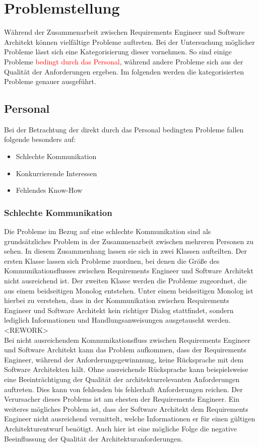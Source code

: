 \section{Problemstellung}
Während der Zusammenarbeit zwischen Requirements Engineer und Software Architekt können vielfältige Probleme auftreten. Bei der Untersuchung möglicher Probleme lässt sich eine Kategorisierung dieser vornehmen. So sind einige Probleme \textcolor{red}{bedingt durch das Personal}, während andere Probleme sich aus der Qualität der Anforderungen ergeben. Im folgenden werden die kategorisierten Probleme genauer ausgeführt.

\subsection{Personal}
Bei der Betrachtung der direkt durch das Personal bedingten Probleme fallen folgende besonders auf:
\begin{itemize} 
\item Schlechte Kommunikation
\item Konkurrierende Interessen
\item Fehlendes Know-How \\
\end{itemize}

\subsubsection{Schlechte Kommunikation}
Die Probleme im Bezug auf eine schlechte Kommunikation sind als grundsätzliches Problem in der Zusammenarbeit zwischen mehreren Personen zu sehen. In diesem Zusammenhang lassen sie sich in zwei Klassen aufteilten. Der ersten Klasse lassen sich Probleme zuordnen, bei denen die Größe des Kommunikationsflusses zwischen Requirements Engineer und Software Architekt nicht ausreichend ist. Der zweiten Klasse werden die Probleme zugeordnet, die aus einem beidseitigen Monolog entstehen. Unter einem beidseitigen Monolog ist hierbei zu verstehen, dass in der Kommunikation zwischen Requirements Engineer und Software Architekt kein richtiger Dialog stattfindet, sondern lediglich Informationen und Handlungsanweisungen ausgetauscht werden. <REWORK>\\

Bei nicht ausreichendem Kommunikationsfluss zwischen Requirements Engineer und Software Architekt kann das Problem aufkommen, dass der Requirements Engineer, während der Anforderungsgewinnnung, keine Rücksprache mit dem Software Architekten hält. Ohne ausreichende Rücksprache kann beispielsweise eine Beeinträchtigung der Qualität der architekturrelevanten Anforderungen auftreten. Dies kann von fehlenden bis fehlerhaft Anforderungen reichen. Der Verursacher dieses Problems ist am ehesten der Requirements Engineer. Ein weiteres mögliches Problem ist, dass der Software Architekt dem Requirements Engineer nicht ausreichend vermittelt, welche Informationen er für einen gültigen Architekturentwurf benötigt. Auch hier ist eine mögliche Folge die negative Beeinflussung der Qualität der Architekturanforderungen.\\

